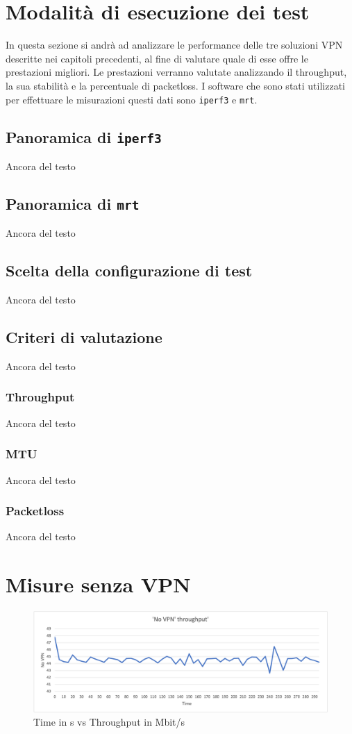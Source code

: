 \section{Modalità di esecuzione dei test}
In questa sezione si andrà ad analizzare le performance delle tre soluzioni VPN descritte nei capitoli precedenti, al fine di valutare quale di esse offre le prestazioni migliori.
Le prestazioni verranno valutate analizzando il throughput, la sua stabilità e la percentuale di packetloss.
I software che sono stati utilizzati per effettuare le misurazioni questi dati sono \texttt{iperf3} e \texttt{mrt}.

\subsection{Panoramica di \texttt{iperf3}}
Ancora del testo

\subsection{Panoramica di \texttt{mrt}}
Ancora del testo

\subsection{Scelta della configurazione di test}
Ancora del testo

\subsection{Criteri di valutazione}
Ancora del testo

\subsubsection{Throughput}
Ancora del testo

\subsubsection{MTU}
Ancora del testo

\subsubsection{Packetloss}
Ancora del testo

\section{Misure senza VPN}
\begin{figure}[ht]
    \centering
    \includegraphics[width=12cm]{figure/vpn_thr.png-1.png}
    \caption{Time in s vs Throughput in Mbit/s}
\end{figure}


